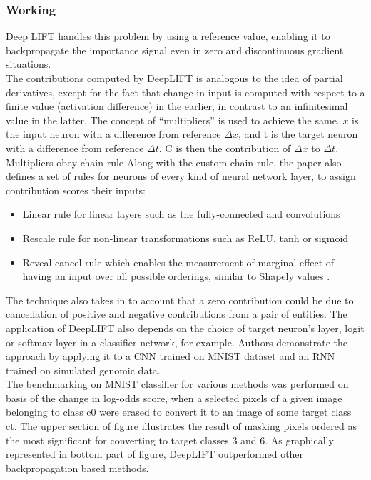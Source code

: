 \documentclass[../report.tex]{subfiles}
\begin{document}
 \subsubsection*{Working}
 Deep LIFT handles this problem by using a reference value, enabling it to backpropagate the importance signal even in zero and discontinuous gradient situations.\\
 The contributions computed by DeepLIFT is analogous to the idea of partial derivatives, except for the fact that change in input is computed with respect to a finite value (activation difference) in the earlier, in contrast to an infinitesimal value in the latter. The concept of \enquote{multipliers} is used to achieve the same.
 $x$ is the input neuron with a difference from reference $\Delta x$, and t is the target neuron with a difference from reference $\Delta t$. C is then the contribution of $\Delta x$ to $\Delta t$.
 Multipliers obey chain rule
 Along with the custom chain rule, the paper also defines a set of rules for neurons of every kind of neural network layer, to assign contribution scores their inputs:
 \begin{itemize}
 	\item Linear rule for linear layers such as the fully-connected and convolutions
 	\item Rescale rule for non-linear transformations such as ReLU, tanh or sigmoid
 	\item Reveal-cancel rule which enables the measurement of marginal effect of having an input over all possible orderings, similar to Shapely values \cite{shapley_values}. 
 \end{itemize}
The technique also takes in to account that a zero contribution could be due to cancellation of positive and negative contributions from a pair of entities. The application of DeepLIFT also depends on the choice of target neuron’s layer, logit or softmax layer in a classifier network, for example. Authors demonstrate the approach by applying it to a CNN trained on MNIST dataset \cite{lecun1998gradient} and an RNN trained on simulated genomic data.\\
The benchmarking on MNIST classifier for various methods was performed on basis of the change in log-odds score, when a selected pixels of a given image belonging to class c0 were erased to convert it to an image of some target class ct. The upper section of figure illustrates the result of masking pixels ordered as the most significant for converting to target classes 3 and 6. As graphically represented in bottom part of figure, DeepLIFT outperformed other backpropagation based methods.
\end{document}
